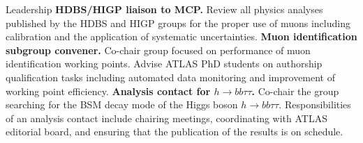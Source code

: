 \begin{rubric}{Leadership}
\entry*[2024 -- current]%
	\textbf{HDBS/HIGP liaison to MCP.}  Review all physics analyses published by the HDBS and HIGP groups for the proper use of muons including calibration and the application of systematic uncertainties.
%
\entry*[2024 -- current]%
\textbf{Muon identification subgroup convener.}  Co-chair group focused on performance of muon identification working points.  Advise ATLAS PhD students on authorship qualification tasks including automated data monitoring and improvement of working point efficiency.
%
\entry*[2021 -- 2024]%
\textbf{Analysis contact for $h\rightarrow bb\tau\tau$.}  Co-chair the group searching for the BSM decay mode of the Higgs boson $h\rightarrow bb\tau\tau$.  Responsibilities of an analysis contact include chairing meetings, coordinating with ATLAS editorial board, and ensuring that the publication of the results is on schedule.
%
\end{rubric}